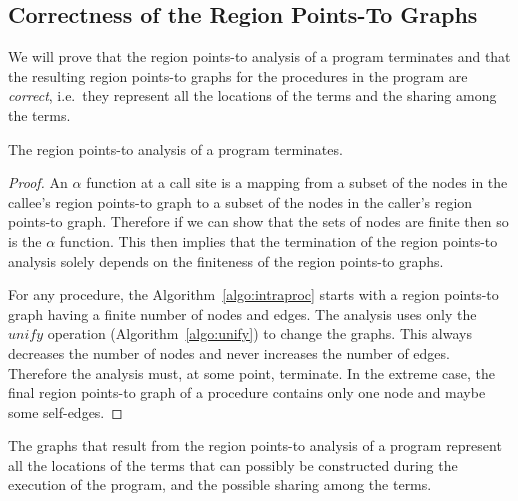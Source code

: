 \documentclass{tlp}
\begin{document}
\subsection{Correctness of the Region Points-To Graphs}

We will prove that the region points-to analysis of a program terminates
and that the resulting region points-to graphs
for the procedures in the program are \emph{correct},
i.e.\ they represent all the locations of the terms
and the sharing among the terms.

\begin{theorem}
\label{theorem:termination}
The region points-to analysis of a program terminates.
\end{theorem}
\begin{proof}
An $\alpha$ function at a call site is a mapping
from a subset of the nodes in the callee's region points-to graph
to a subset of the nodes in the caller's region points-to graph.
Therefore if we can show that the sets of nodes are finite
then so is the $\alpha$ function.
This then implies that the termination
of the region points-to analysis solely depends on
the finiteness of the region points-to graphs.

For any procedure, the Algorithm~\ref{algo:intraproc}
starts with a region points-to graph
having a finite number of nodes and edges.
The analysis uses only the $\mathit{unify}$ operation
(Algorithm~\ref{algo:unify}) to change the graphs.
This always decreases the number of nodes
and never increases the number of edges.
Therefore the analysis must, at some point, terminate.
In the extreme case,
the final region points-to graph of a procedure
contains only one node and maybe some self-edges.
\end{proof}

\begin{theorem}
\label{theorem:loc_and_sharing}
The graphs that result from the region points-to analysis of a program
represent all the locations of the terms
that can possibly be constructed during the execution of the program,
and the possible sharing among the terms.
\end{theorem}
\end{document}
